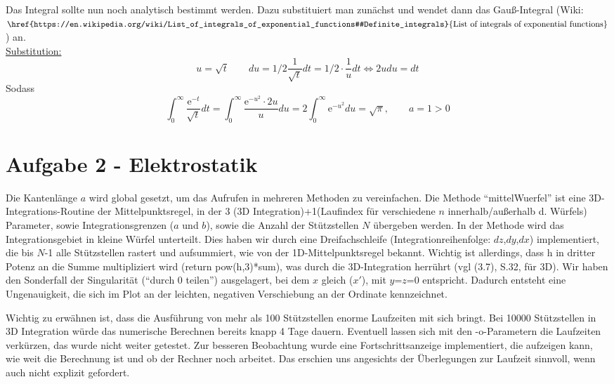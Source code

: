 Das Integral sollte nun noch analytisch bestimmt werden. Dazu substituiert man zunächst und wendet dann das Gauß-Integral (Wiki: $\href{https://en.wikipedia.org/wiki/List_of_integrals_of_exponential_functions#Definite_integrals}{\text{List of integrals of exponential functions}}$) an.\\
\underline{Substitution:}
\begin{equation*}
u = \sqrt{t} \qquad du = 1/2 \frac{1}{\sqrt{t}} dt = 1/2 \cdot \frac{1}{u} dt \Leftrightarrow 2udu = dt
\end{equation*}
Sodass
\begin{equation*}
\int_0^{\infty} \frac{\mathup{e}^{-t}}{\sqrt{t}} dt = \int_0^{\infty} \frac{\mathup{e}^{-u^2}\cdot 2u}{u} du = 2 \int_0^{\infty} \mathup{e}^{-u^2} du = \sqrt{\pi}, \qquad a=1>0
\end{equation*}




\section*{Aufgabe 2 - Elektrostatik}
Die Kantenlänge $a$ wird global gesetzt, um das Aufrufen in mehreren Methoden zu vereinfachen. Die Methode \enquote{mittelWuerfel} ist eine 3D-Integrations-Routine der Mittelpunktsregel, in der 3 (3D Integration)+1(Laufindex für verschiedene $n$ innerhalb/außerhalb d. Würfels) Parameter, sowie Integrationsgrenzen ($a$ und $b$), sowie die Anzahl der Stützstellen $N$ übergeben werden. In der Methode wird das Integrationsgebiet in kleine Würfel unterteilt. Dies haben wir durch eine Dreifachschleife (Integrationreihenfolge: $dz$,$dy$,$dx$) implementiert, die bis $N$-1 alle Stützstellen rastert und aufsummiert, wie von der 1D-Mittelpunktsregel bekannt. Wichtig ist allerdings, dass h in dritter Potenz an die Summe multipliziert wird (return pow(h,3)*sum), was durch die 3D-Integration herrührt (vgl (3.7), S.32, für 3D).
Wir haben den Sonderfall der Singularität (\enquote{durch 0 teilen}) ausgelagert, bei dem $x$ gleich ($x'$), mit $y$=$z$=0 entspricht. Dadurch entsteht eine Ungenauigkeit, die sich im Plot an der leichten, negativen Verschiebung an der Ordinate kennzeichnet.

Wichtig zu erwähnen ist, dass die Ausführung von mehr als 100 Stützstellen enorme Laufzeiten mit sich bringt. Bei 10000 Stützstellen in 3D Integration würde das numerische Berechnen bereits knapp 4 Tage dauern. Eventuell lassen sich mit den -o-Parametern die Laufzeiten verkürzen, das wurde nicht weiter getestet. Zur besseren Beobachtung wurde eine Fortschrittsanzeige implementiert, die aufzeigen kann, wie weit die Berechnung ist und ob der Rechner noch arbeitet. Das erschien uns angesichts der Überlegungen zur Laufzeit sinnvoll, wenn auch nicht explizit gefordert.
